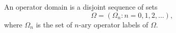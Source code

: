 An operator domain is a disjoint sequence of sets
$$
\Omega = (\Omega_n : n = 0, 1, 2, \ldots),
$$
where $\Omega_n$ is the set of $n$-ary operator labels of $\Omega$.
